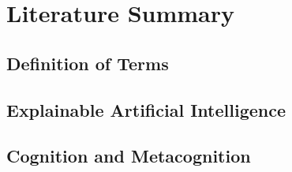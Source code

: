 \section{Literature Summary} \label{sec:literature_summary}

\subsection{Definition of Terms}

\subsection{Explainable Artificial Intelligence}

\subsection{Cognition and Metacognition}
